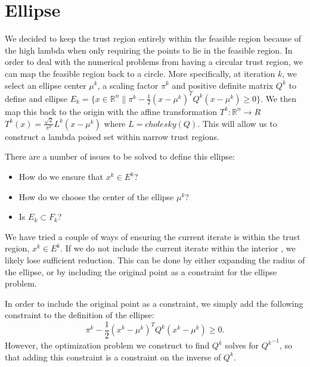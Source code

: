 \documentclass{article}
\begin{document}
    
\section{Ellipse}


We decided to keep the trust region entirely within the feasible region because of the high lambda when only requiring the points to lie in the feasible region.
In order to deal with the numerical problems from having a circular trust region, we can map the feasible region back to a circle.
More specifically, at iteration $k$, we select an ellipse center $\mu^k$, a scaling factor $\pi^k$ and positive definite matrix $Q^k$ to define and ellipse
$E_k = \{x \in \mathbb R^n \| \pi^k - \frac 1 2 (x - \mu^{k})^TQ^{k}(x - \mu^{k}) \ge 0 \}$.
We then map this back to the origin with the affine transformation $T^k : \mathbb R^n \to R$ $T^k(x) = \frac {\sqrt{2}}{\pi^k} L^k(x-\mu^k)$ where $L = cholesky(Q)$.
This will allow us to construct a lambda poised set within narrow trust regions.

There are a number of issues to be solved to define this ellipse:
\begin{itemize}
\item How do we ensure that $x^k \in E^k$?
\item How do we choose the center of the ellipse $\mu^k$?
\item Is $E_k \subset F_k$?
\end{itemize}

We have tried a couple of ways of ensuring the current iterate is within the trust region, $x^k \in E^k$.
If we do not include the current iterate \color{red} within the interior \color{black}, we likely lose sufficient reduction.
This can be done by either expanding the radius of the ellipse, or by including the original point as a constraint for the ellipse problem.


In order to include the original point as a constraint, we simply add the following constraint to the definition of the ellipse:
$$ \pi^k - \frac 1 2 (x^k - \mu^{k})^TQ^{k}(x^k - \mu^{k}) \ge 0. $$
However, the optimization problem we construct to find $Q^k$ solves for ${Q^k}^{-1}$, so that adding this constraint is a constraint on the inverse of $Q^k$.



\end{document}
